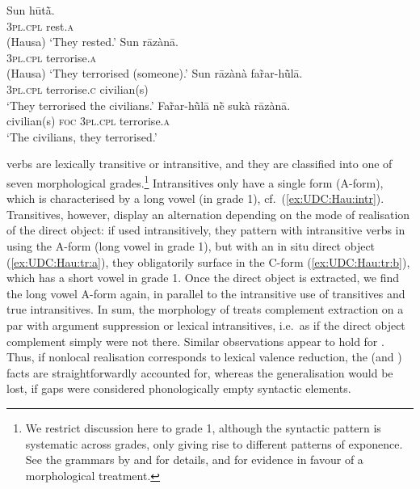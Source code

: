 \documentclass[output=paper
,notxmath 
 	        ,biblatex
                ,babelshorthands
                ,newtxmath
                ,draftmode
                ,colorlinks, citecolor=brown
]{langscibook}
\begin{document}
\ea
\gll Sun hūtā̀.\\
  \textsc{3pl.cpl} rest.\textsc{a}\\\hfill(Hausa)
\glt `They rested.' \hfill \label{ex:UDC:Hau:intr}
\z
\eal
\label{ex:UDC:Hau:tr}
    \ex\label{ex:UDC:Hau:tr:a} 
    \gll Sun rāzànā.\footnotemark\\
         \textsc{3pl.cpl} terrorise.\textsc{a}\\\hfill{(Hausa)}
    \glt `They terrorised (someone).'
    \ex\label{ex:UDC:Hau:tr:b} 
    \gll Sun rāzànà far̃ar-hū̀lā.\footnotemark\\
         \textsc{3pl.cpl} terrorise.\textsc{c} civilian(s)\\
    \glt `They terrorised the civilians.'
    \ex 
    \gll Far̃ar-hū̀lā nḕ sukà rāzànā.\\
         civilian(s) \textsc{foc} \textsc{3pl.cpl} terrorise.\textsc{a}\\
    \glt `The civilians, they terrorised.' 
\zl

\noindent
{} verbs are lexically transitive or intransitive, and they
are classified into one of seven morphological grades.\footnote{We
  restrict discussion here to grade 1, although the syntactic pattern
  is systematic across grades, only giving rise to different patterns
  of exponence. See the  grammars by \citet{newman_p00} and
  \citet{jaggar01:_hausa} for details, and \citet{crysmann_b04yom} for
  evidence in favour of a morphological treatment. } Intransitives
only have a single form (A-form), which is characterised by a long
vowel (in grade 1), cf.\ (\ref{ex:UDC:Hau:intr}). Transitives, however,
display an alternation depending on the mode of realisation of the
direct object: if used intransitively, they pattern with intransitive
verbs in using the A-form (long vowel in grade 1), but with an in situ
direct object (\ref{ex:UDC:Hau:tr:a}), they obligatorily surface in
the C-form (\ref{ex:UDC:Hau:tr:b}), which has a short vowel in grade
1. Once the direct object is extracted, we find the long vowel A-form
again, in parallel to the intransitive use of transitives and true
intransitives. In sum, the morphology of  treats complement
extraction on a par with argument suppression or lexical
intransitives, i.e.\ as if the direct object complement simply were
not there. Similar observations appear to hold for 
\citep[Section~4.2.3]{Henri2010a-u}. Thus, if nonlocal realisation
corresponds to lexical valence reduction, the  (and
) facts are straightforwardly accounted for, whereas
the generalisation would be lost, if gaps were considered
phonologically empty syntactic elements.
\end{document}
